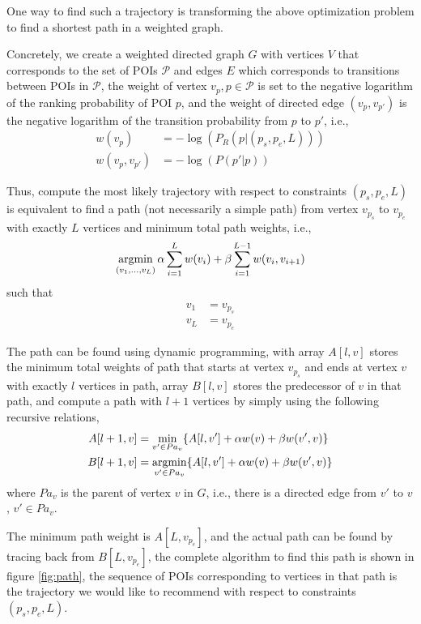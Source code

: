 One way to find such a trajectory is transforming the above optimization problem to 
find a shortest path in a weighted graph.

Concretely,
we create a weighted directed graph $G$ with vertices $V$ that corresponds to the set of POIs $\mathcal{P}$ and 
edges $E$ which corresponds to transitions between POIs in $\mathcal{P}$,
the weight of vertex $v_{p}, p \in \mathcal{P}$ is set to the negative logarithm of the ranking probability of POI $p$, 
and the weight of directed edge $(v_p, v_{p'})$ is the negative logarithm of the transition probability from $p$ to $p'$,
i.e.,
\begin{align*}
    w(v_{p})       & = -\log(P_R(p | (p_s, p_e, L))) \\
    w(v_p, v_{p'}) & = -\log(P(p' | p))
\end{align*}

Thus, compute the most likely trajectory with respect to constraints $(p_s, p_e, L)$ is
equivalent to find a path (not necessarily a simple path) from vertex $v_{p_s}$ to
$v_{p_e}$ with exactly $L$ vertices and minimum total path weights,
i.e.,
\begin{displaymath}
    \operatorname*{argmin}_{(v_1, \dots, v_L)} \alpha \sum_{i=1}^{L} w(v_i) + \beta \sum_{i=1}^{L-1} w(v_i, v_{i+1})
\end{displaymath}
such that
\begin{align*}
    v_1 &= v_{p_s} \\
    v_L &= v_{p_e} 
\end{align*}
    
The path can be found using dynamic programming, 
with array $A[l, v]$ stores the minimum total weights of path 
that starts at vertex $v_{p_s}$ and ends at vertex $v$ with 
exactly $l$ vertices in path,
array $B[l, v]$ stores the predecessor of $v$ in that path,
and compute a path with $l+1$ vertices by simply using the following recursive relations,
\begin{align*}
    A[l+1, v] &= \min_{v' \in Pa_v} \{ A[l, v'] + \alpha w(v) + \beta w(v', v) \} \\
    B[l+1, v] &= \operatorname*{argmin}_{v' \in Pa_v} \{ A[l, v'] + \alpha w(v) + \beta w(v', v) \} 
\end{align*}
where $Pa_v$ is the parent of vertex $v$ in $G$,
i.e., 
there is a directed edge from $v'$ to $v$, $v' \in Pa_v$.

The minimum path weight is $A[L, v_{p_e}]$,
and the actual path can be found by tracing back from $B[L, v_{p_e}]$,
the complete algorithm to find this path is shown in figure \ref{fig:path},
the sequence of POIs corresponding to vertices in that path is the 
trajectory we would like to recommend with respect to constraints $(p_s, p_e, L)$.

